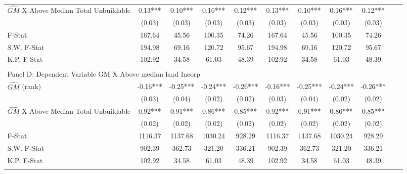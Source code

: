 \begin{table}[htbp]
\begin{threeparttable}
\begin{tabular}{l*{10}{c}}
\addlinespace
$\hat{GM}$ X Above Median Total Unbuildable&       0.13***&       0.10***&       0.16***&       0.12***&       0.13***&       0.10***&       0.16***&       0.12***\\
                &     (0.03)   &     (0.03)   &     (0.03)   &     (0.03)   &     (0.03)   &     (0.03)   &     (0.03)   &     (0.03)   \\
\midrule
F-Stat          &     167.64   &      45.56   &     100.35   &      74.26   &     167.64   &      45.56   &     100.35   &      74.26   \\
S.W. F-Stat     &     194.98   &      69.16   &     120.72   &      95.67   &     194.98   &      69.16   &     120.72   &      95.67   \\
K.P. F-Stat     &     102.92   &      34.58   &      61.03   &      48.39   &     102.92   &      34.58   &      61.03   &      48.39   \\
\cmidrule[\heavyrulewidth](lr){1-9} \\ \cmidrule[\heavyrulewidth](lr){1-9}
\multicolumn{8}{l}{Panel D: Dependent Variable GM X Above median land Incorp}\\
\cmidrule(lr){1-9}
$\hat{GM}$ (rank)&      -0.16***&      -0.25***&      -0.24***&      -0.26***&      -0.16***&      -0.25***&      -0.24***&      -0.26***\\
                &     (0.03)   &     (0.04)   &     (0.02)   &     (0.02)   &     (0.03)   &     (0.04)   &     (0.02)   &     (0.02)   \\
\addlinespace
$\hat{GM}$ X Above Median Total Unbuildable&       0.92***&       0.91***&       0.86***&       0.85***&       0.92***&       0.91***&       0.86***&       0.85***\\
                &     (0.02)   &     (0.02)   &     (0.02)   &     (0.02)   &     (0.02)   &     (0.02)   &     (0.02)   &     (0.02)   \\
\midrule
F-Stat          &    1116.37   &    1137.68   &    1030.24   &     928.29   &    1116.37   &    1137.68   &    1030.24   &     928.29   \\
S.W. F-Stat     &     902.39   &     362.73   &     321.20   &     336.21   &     902.39   &     362.73   &     321.20   &     336.21   \\
K.P. F-Stat     &     102.92   &      34.58   &      61.03   &      48.39   &     102.92   &      34.58   &      61.03   &      48.39   \\
\cmidrule[\heavyrulewidth](lr){1-9} \\ \cmidrule[\heavyrulewidth](lr){1-9}

\end{tabular}
\end{threeparttable}
\end{table}
